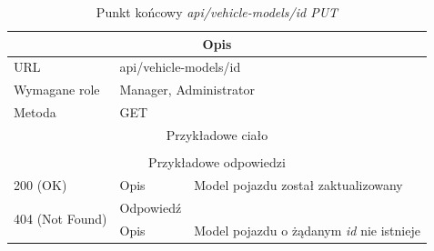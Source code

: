 \documentclass[eng,printmode,openany]{mgr}
\begin{document}
	\begin{table}[H]
		\caption{Punkt końcowy \textit{api/vehicle-models/id PUT}}
		\begin{tabularx}{\textwidth}{|l|l|X|}
			\hline
			\multicolumn{3}{|c|}{Opis}                         						\\ \hline
			URL                       & \multicolumn{2}{l|}{api/vehicle-models/id} 	\\ \hline
			Wymagane role             & \multicolumn{2}{l|}{Manager, Administrator} \\ \hline
			Metoda                    & \multicolumn{2}{l|}{GET} 					\\ \hline
			\multicolumn{3}{|c|}{Przykładowe ciało}         						\\ \hline
			\multicolumn{3}{|c|}{} 												\\ \hline
			\multicolumn{3}{|c|}{Przykładowe odpowiedzi}                   																		\\ \hline
			200 (OK)			& Opis         	& Model pojazdu został zaktualizowany 															\\ \hline
			\multirow{2}{*}{404 (Not Found)} 	& Odpowiedź     &    \\ \cline{2-3} 
			& Opis          & Model pojazdu o żądanym \textit{id} nie istnieje  											\\ \hline
		\end{tabularx}
	\end{table}
	
\end{document}
